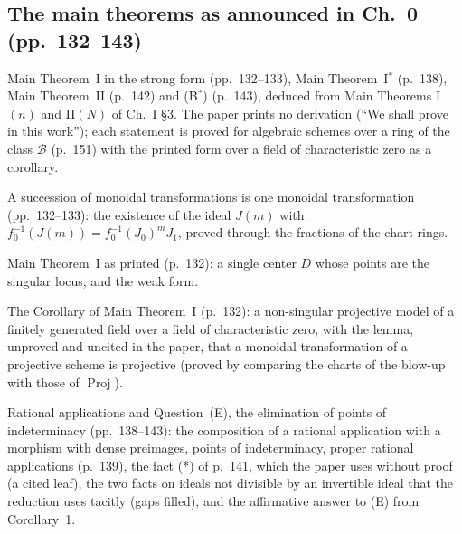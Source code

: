 
\subsection*{The main theorems as announced in Ch.~0 (pp.~132--143)}
Main Theorem~I in the strong form (pp.~132--133), Main Theorem~I$^*$ (p.~138), Main Theorem~II (p.~142) and (B$^*$)
(p.~143), deduced from Main Theorems I$(n)$ and II$(N)$ of Ch.~I \S3. The paper prints no derivation (``We shall prove in
this work''); each statement is proved for algebraic schemes over a ring of the class $\mathcal B$ (p.~151) with the
printed form over a field of characteristic zero as a corollary.


A succession of monoidal transformations is one monoidal transformation (pp.~132--133): the existence of the ideal $J(m)$
with $f_0^{-1}(J(m))=f_0^{-1}(J_0)^mJ_1$, proved through the fractions of the chart rings.



Main Theorem~I as printed (p.~132): a single center $D$ whose points are the singular locus, and the weak form.


The Corollary of Main Theorem~I (p.~132): a non-singular projective model of a finitely generated field over a field of
characteristic zero, with the lemma, unproved and uncited in the paper, that a monoidal transformation of a projective
scheme is projective (proved by comparing the charts of the blow-up with those of $\operatorname{Proj}$).






Rational applications and Question~(E), the elimination of points of indeterminacy (pp.~138--143): the composition of a
rational application with a morphism with dense preimages, points of indeterminacy, proper rational applications (p.~139),
the fact (*) of p.~141, which the paper uses without proof (a cited leaf), the two facts on ideals not divisible by an
invertible ideal that the reduction uses tacitly (gaps filled), and the affirmative answer to (E) from Corollary~1.

